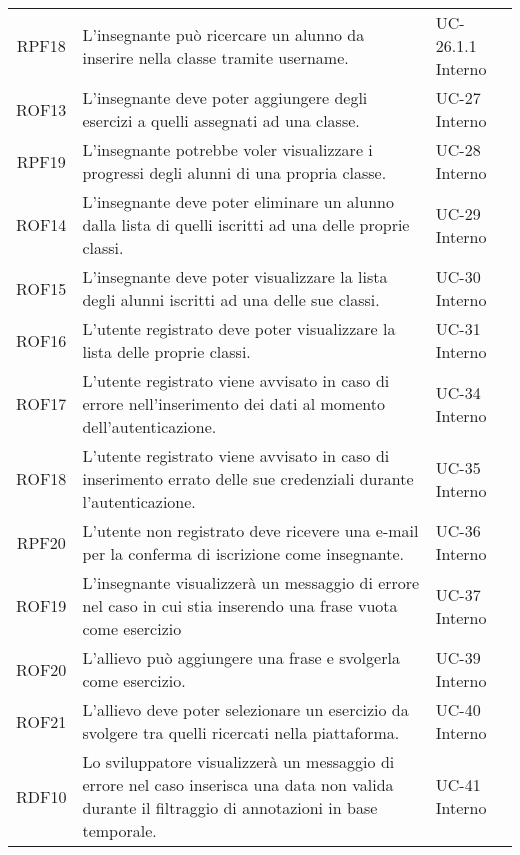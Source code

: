 \begin{tabularx}{\textwidth}{| c | p{10cm} | X |}
		RPF18 & L'insegnante può ricercare un alunno da inserire nella classe tramite username. & UC-26.1.1 \newline Interno\\
		ROF13 & L'insegnante deve poter aggiungere degli esercizi a quelli assegnati ad una classe. & UC-27 \newline Interno\\
		RPF19 & L'insegnante potrebbe voler visualizzare i progressi degli alunni di una propria classe. & UC-28 \newline Interno\\
		ROF14 & L'insegnante deve poter eliminare un alunno dalla lista di quelli iscritti ad una delle proprie classi. & UC-29 \newline Interno\\
		ROF15 & L'insegnante deve poter visualizzare la lista degli alunni iscritti ad una delle sue classi. & UC-30 \newline Interno\\
		ROF16 & L'utente registrato deve poter visualizzare la lista delle proprie classi. & UC-31 \newline Interno\\
		 ROF17 & L'utente registrato viene avvisato in caso di errore nell'inserimento dei dati al momento dell'autenticazione. & UC-34 \newline Interno\\
		ROF18 & L'utente registrato viene avvisato in caso di inserimento errato delle sue credenziali durante l'autenticazione. & UC-35 \newline Interno\\
		RPF20 & L'utente non registrato deve ricevere una e-mail per la conferma di iscrizione come insegnante. & UC-36 \newline Interno\\
		ROF19 & L'insegnante visualizzerà un messaggio di errore nel caso in cui stia inserendo una frase vuota come esercizio & UC-37 \newline Interno\\
		ROF20 & L'allievo può aggiungere una frase e svolgerla come esercizio. & UC-39 \newline Interno\\
		ROF21 & L'allievo deve poter selezionare un esercizio da svolgere tra quelli ricercati nella piattaforma. & UC-40 \newline Interno\\
		RDF10 & Lo sviluppatore visualizzerà un messaggio di errore nel caso inserisca una data non valida durante il filtraggio di annotazioni in base temporale. & UC-41 \newline Interno\\

\end{tabularx}
